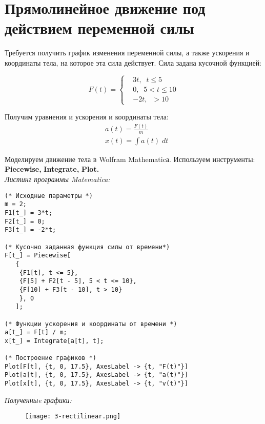 \section[Прямолинейное движение под действием переменной силы]{Прямолинейное движение под действием переменной силы}

Требуется получить график изменения переменной силы, а также ускорения и координаты тела, на которое эта сила действует.
Сила задана кусочной функцией:

\begin{equation*}
    F(t) = 
    \left\{
        \begin{aligned}
            &3t,\;\; t \leq 5\\
            &0, \;\; 5 < t \leq 10\\
            &-2t, \;\; > 10
        \end{aligned}
    \right. 
\end{equation*}

Получим уравнения и ускорения и координаты тела:
\begin{equation*}
    \begin{aligned}
        &a(t) = \frac{F(t)}{m}\\
        &x(t) = \int a(t)\;dt
    \end{aligned}
\end{equation*}

Моделируем движение тела в Wolfram Mathematicа. 
Используем инструменты: 
\textbf{Piecewise,} 
\textbf{Integrate,} 
\textbf{Plot.}\\[10pt]

\textit{Листинг программы Matematica:}
\begin{lstlisting}
(* Исходные параметры *)
m = 2;
F1[t_] = 3*t;
F2[t_] = 0;
F3[t_] = -2*t;

(* Кусочно заданная функция силы от времени*)
F[t_] = Piecewise[ 
   {
    {F1[t], t <= 5}, 
    {F[5] + F2[t - 5], 5 < t <= 10},
    {F[10] + F3[t - 10], t > 10}
    }, 0
   ];

(* Функции ускорения и координаты от времени *)
a[t_] = F[t] / m;
x[t_] = Integrate[a[t], t];

(* Построение графиков *)
Plot[F[t], {t, 0, 17.5}, AxesLabel -> {t, "F(t)"}]
Plot[a[t], {t, 0, 17.5}, AxesLabel -> {t, "a(t)"}]
Plot[x[t], {t, 0, 17.5}, AxesLabel -> {t, "v(t)"}]
\end{lstlisting} 
\textit{Полученныe графики:}
\begin{figure}[ht]
\centering
    \texttt{[image: 3-rectilinear.png]}
\end{figure}
